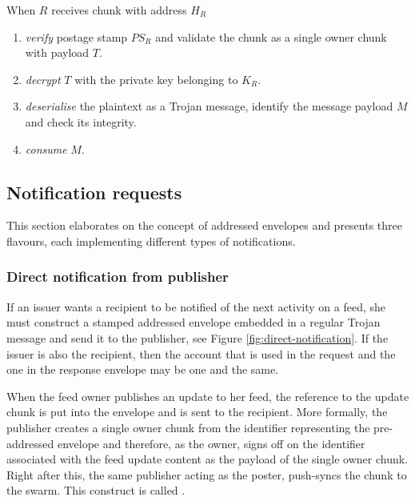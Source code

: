 When $R$ receives chunk with address $H_R$

\begin{enumerate}[noitemsep]
\item \emph{verify} postage stamp $PS_R$ and validate the chunk as a single owner chunk with payload $T$.
\item \emph{decrypt} $T$ with the private key belonging to $K_R$.
\item \emph{deserialise} the plaintext as a Trojan message, identify the message payload $M$ and check its integrity.
\item \emph{consume} $M$.
\end{enumerate}

\subsection{Notification requests\statusgreen}\label{sec:notification-requests} 


This section elaborates on the concept of addressed envelopes and presents three flavours, each implementing different types of notifications.

\subsubsection{Direct notification from publisher}

If an issuer wants a recipient to be notified of the next activity on a feed, she must construct a stamped addressed envelope embedded in a regular Trojan message and send it to the publisher, see Figure \ref{fig:direct-notification}. If the issuer is also the recipient, then the account that is used in the request and the one in the response envelope may be one and the same. 


When the feed owner publishes an update to her feed, the reference to the update chunk is put into the envelope and is sent to the recipient. More formally, the publisher creates a single owner chunk from the identifier representing the pre-addressed envelope and therefore, as the owner, signs off on the identifier associated with the feed update content as the payload of the single owner chunk. Right after this, the same publisher acting as the poster, push-syncs the chunk to the swarm. This construct is called . 

